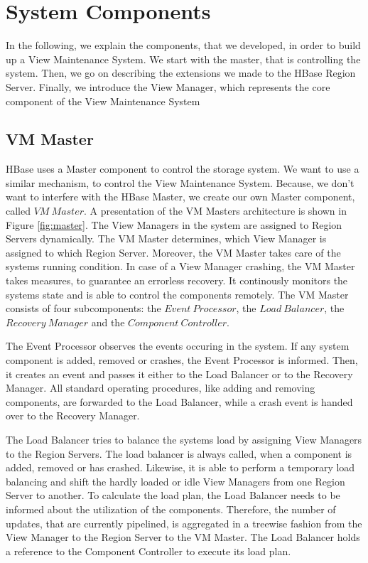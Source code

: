 \documentclass[11pt,a4paper,bibtotoc,idxtotoc,headsepline,footsepline,footexclude,BCOR12mm,DIV13]{scrbook}
\begin{document}
\section{System Components}
\label{sec:systemcomponents}

In the following, we explain the components, that we developed, in order to build up a View Maintenance System.  We start with the master, that is controlling the system. Then, we go on describing the extensions we made to the HBase Region Server. Finally, we introduce the View Manager, which represents the core component of the View Maintenance System \\



\subsection{VM Master}
HBase uses a Master component to control the storage system. We want to use a similar mechanism, to control the View Maintenance System. Because, we don't want to interfere with the HBase Master, we create our own Master component, called $VM\:Master$. A presentation of the VM Masters architecture is shown in Figure \ref{fig:master}. The View Managers in the system are assigned to Region Servers dynamically. The VM Master determines, which View Manager is assigned to which Region Server. Moreover, the VM Master takes care of the systems running condition. In case of a View Manager crashing, the VM Master takes measures, to guarantee an errorless recovery. It continously monitors the systems state and is able to control the components remotely. The VM Master consists of four subcomponents: the $Event\:Processor$, the $Load\:Balancer$, the $Recovery\:Manager$ and the $Component\:Controller$. 

The Event Processor observes the events occuring in the system. If any system component is added, removed or crashes, the Event Processor is informed. Then, it creates an event and passes it either to the Load Balancer or to the Recovery Manager. All standard operating procedures, like adding and removing components, are forwarded to the Load Balancer, while a crash event is handed over to the Recovery Manager. 

The Load Balancer tries to balance the systems load by assigning View Managers to the Region Servers. The load balancer is always called, when a component is added, removed or has crashed. Likewise, it is able to perform a temporary load balancing and shift the hardly loaded or idle View Managers from one Region Server to another. To calculate the load plan, the Load Balancer needs to be informed about the utilization of the components. Therefore, the number of updates, that are currently pipelined, is aggregated in a treewise fashion from the View Manager to the Region Server to the VM Master. The Load Balancer holds a reference to the Component Controller to execute its load plan.
\end{document}

